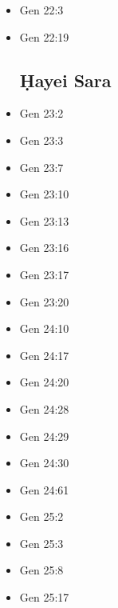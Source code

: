 \documentclass[14pt]{book}
\begin{document}
\begin{multicols}{2}
\begin{itemize}
\item Gen 22:3

\item Gen 22:19

\subsection{\d{H}ayei Sara}

\item Gen 23:2

\item Gen 23:3

\item Gen 23:7

\item Gen 23:10

\item Gen 23:13

\item Gen 23:16

\item Gen 23:17

\item Gen 23:20

\item Gen 24:10

\item Gen 24:17

\item Gen 24:20

\item Gen 24:28

\item Gen 24:29

\item Gen 24:30

\item Gen 24:61

\item Gen 25:2

\item Gen 25:3

\item Gen 25:8

\item Gen 25:17


\end{itemize}
\end{multicols}
\end{document}
